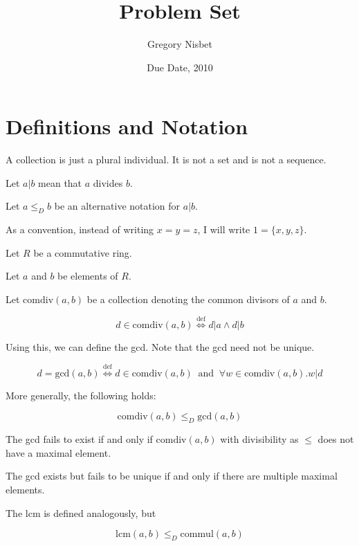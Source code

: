 \documentclass[10pt,letter]{article}
\begin{document}


\title{Problem Set}

\author{Gregory Nisbet}

\date{Due Date, 2010}
 
\maketitle 

\section*{Definitions and Notation}

A collection is just a plural individual. It is not a set and is not a sequence.

Let $a|b$ mean that $a$ divides $b$.

Let $a \le_D b$ be an alternative notation for $a|b$.

As a convention, instead of writing $x=y=z$, I will write $1 = \{x, y, z\}$.


Let $R$ be a commutative ring.

Let $a$ and $b$ be elements of $R$.

Let $\text{comdiv}(a, b)$ be a collection denoting the common divisors of $a$ and $b$.

$$ d \in \text{comdiv}(a, b) \stackrel{\text{def}}{\iff} d | a \land d | b $$

Using this, we can define the gcd. Note that the gcd need not be unique.

$$ d = \text{gcd}(a, b) \stackrel{\text{def}}{\iff} d \in \text{comdiv}(a, b) \;\;\text{and}\;\; \forall w \in \text{comdiv}(a, b) \text{.} w | d $$

More generally, the following holds:

$$ \text{comdiv}(a, b) \le_D \text{gcd}(a, b) $$

The gcd fails to exist if and only if $\text{comdiv}(a, b)$ with divisibility as $\le$ does not have a maximal element.

The gcd exists but fails to be unique if and only if there are multiple maximal elements.

The lcm is defined analogously, but

$$ \text{lcm}(a, b) \le_D \text{commul}(a, b) $$
\end{document}
